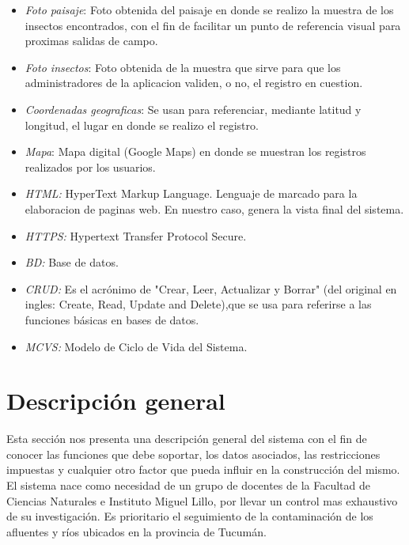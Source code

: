 \begin{itemize}
        

        \item \emph{Foto paisaje}: Foto obtenida del paisaje en donde se realizo la muestra de los insectos encontrados, con el fin de facilitar un punto de referencia visual para proximas salidas de campo.
        
        \item \emph{Foto insectos}: Foto obtenida de la muestra que sirve para que los administradores de la aplicacion validen, o no, el registro en cuestion.

        \item \emph{Coordenadas geograficas}: Se usan para referenciar, mediante latitud y longitud, el lugar en donde se realizo el registro.

        \item \emph{Mapa}: Mapa digital (Google Maps) en donde se muestran los registros realizados por los usuarios.

        \item \emph{HTML:} HyperText Markup Language. Lenguaje de marcado para la elaboracion de paginas web. En nuestro caso, genera la vista final del sistema.
        
        \item \emph{HTTPS:} Hypertext Transfer Protocol Secure.

        \item \emph{BD:} Base de datos.
 
        \item \emph{CRUD:} Es el acrónimo de "Crear, Leer, Actualizar y Borrar" (del original en ingles: Create, Read, Update and Delete),que se usa para referirse a las funciones básicas en bases de datos.

        \item \emph{MCVS:} Modelo de Ciclo de Vida del Sistema.
        
         \end{itemize}
    

 \section{Descripción general}

    Esta sección nos presenta una descripción general del sistema con el fin de conocer las funciones que debe soportar, los datos asociados, las restricciones impuestas y cualquier otro factor que pueda influir en la construcción del mismo.
    El sistema nace como necesidad de un grupo de docentes de la Facultad de Ciencias Naturales e Instituto Miguel Lillo, por llevar un control mas exhaustivo de su investigación.
    Es prioritario el seguimiento de la contaminación de los afluentes y ríos ubicados en la provincia de Tucumán.
    

